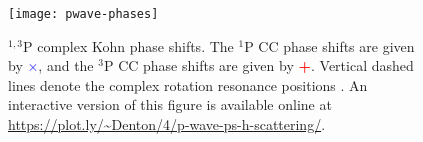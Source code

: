 \documentclass[Dissertation.tex]{subfiles}
\begin{document}
%

\begin{figure}
	\centering
	\texttt{[image: pwave-phases]}
	\caption[$^{1,3}$P phase shifts]{$^{1,3}$P complex Kohn phase shifts. The $^1$P CC phase shifts
\cite{Walters2004} are given by \mbox{\textcolor{blue}{$\times$}}, and the
$^3$P CC phase shifts \cite{Blackwood2002} are given by
\mbox{\textcolor{red}{\textbf{+}}}. Vertical dashed lines denote the complex rotation resonance
positions \cite{Yan1999}. An interactive version of this figure is available online \cite{Plotly}
at \url{https://plot.ly/~Denton/4/p-wave-ps-h-scattering/}.}
	\label{fig:PWavePhase}
\end{figure}
\end{document}
